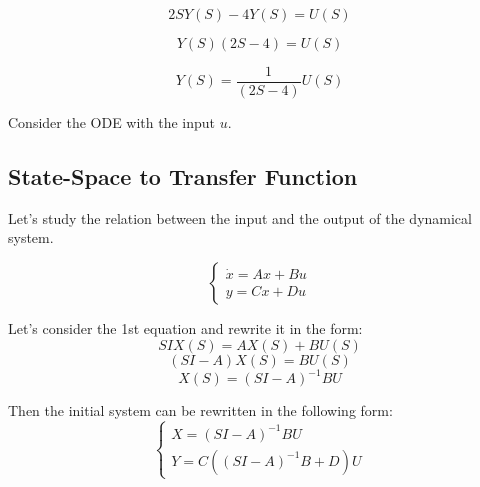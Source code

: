 \begin{equation}
    2SY(S) - 4Y(S) = U(S)
\end{equation}

\begin{equation}
    Y(S)(2S - 4) = U(S)
\end{equation}

\begin{equation}
    Y(S) = \frac{1}{(2S - 4)} U(S)
\end{equation}

Consider the ODE with the input \(u\).

\subsection{State-Space to Transfer Function}

Let's study the relation between the input and the output of the dynamical system. 

\[
\begin{cases}
    \dot x = Ax + Bu \\
    y = Cx + Du
\end{cases}
\] 

Let's consider the 1st equation and rewrite it in the form:
\[SI X(S) = AX(S) + BU(S)\]
\[(SI-A) X(S) = BU(S)\]
\[X(S) = (SI-A)^{-1}BU\]

Then the initial system can be rewritten in the following form:
\[
\begin{cases}
    X = (SI-A)^{-1}BU\\
    Y = C((SI-A)^{-1}B + D)U
\end{cases}
\]

